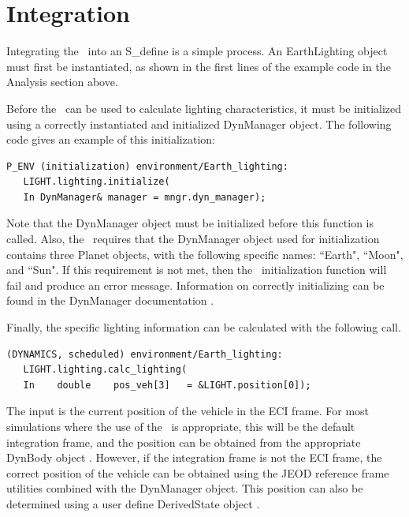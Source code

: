 \section{Integration}

Integrating the \earthlightingDesc\ into an S\_define is a simple process.
An EarthLighting object must first be instantiated, as shown in the first
lines of the example code in the Analysis section above.

Before the \earthlightingDesc\ can be used to calculate lighting
characteristics, it must be initialized using a correctly instantiated
and initialized DynManager object. The following code gives an example
of this initialization:

\begin{verbatim}
P_ENV (initialization) environment/Earth_lighting:
   LIGHT.lighting.initialize(
   In DynManager& manager = mngr.dyn_manager);
\end{verbatim}

Note that the DynManager object must be initialized before this function is called.
Also, the \earthlightingDesc\ requires that the DynManager object used
for initialization contains three Planet objects, with the following
specific names: ``Earth", ``Moon", and ``Sun". If
this requirement is not met, then the \earthlightingDesc\ initialization
function will fail and produce an error message. Information on correctly
initializing can be found in the DynManager documentation \cite{dynenv:DYNMANAGER}.

Finally, the specific lighting information can be calculated with the
following call.

\begin{verbatim}
(DYNAMICS, scheduled) environment/Earth_lighting:
   LIGHT.lighting.calc_lighting(
   In    double    pos_veh[3]   = &LIGHT.position[0]);
\end{verbatim}

The input is the current position of the vehicle in the ECI
 frame. For most simulations where the use of the
\earthlightingDesc\ is appropriate, this will be the default integration
frame, and the position can be obtained from the appropriate DynBody object
\cite{dynenv:DYNBODY}. However, if the integration
frame is not the ECI frame, the correct position of the vehicle can be
obtained using the JEOD reference frame utilities combined
with the DynManager \cite{dynenv:DYNMANAGER} object.
This position can also be determined using
a user define DerivedState object \cite{dynenv:DERIVEDSTATE}.

